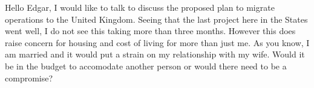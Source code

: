 \documentclass[letterpaper,11pt]{texMemo} %
\begin{document}
\maketitle %


Hello Edgar, I would like to talk to discuss the proposed plan to migrate operations to the United Kingdom. 
Seeing that the last project here in the States went well, I do not see this taking more than three months.
However this does raise concern for housing and cost of living for more than just me.
As you know, I am married and it would put a strain on my relationship with my wife.
Would it be in the budget to accomodate another person or would there need to be a compromise?
\end{document}
